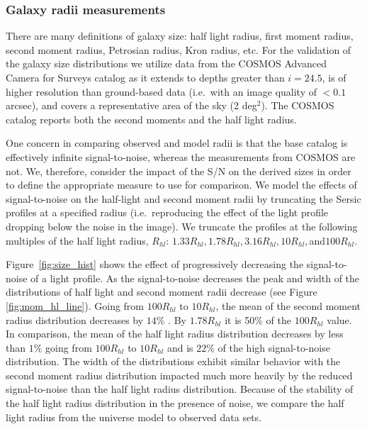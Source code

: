 \documentclass[11pt]{article}
\begin{document}
\subsubsection{Galaxy radii measurements}
There are many definitions of galaxy size: half light radius, first
moment radius, second moment radius, Petrosian radius, Kron radius,
etc.  For the validation of the galaxy size distributions we utilize
data from the COSMOS Advanced Camera for Surveys catalog
\citep{cosmos} as it extends to depths greater than $i=24.5$, is of
higher resolution than ground-based data (i.e.\ with an image quality
of $<0.1$ arcsec), and covers a representative area of the sky (2
deg$^2$). The COSMOS catalog reports both the second moments and the
half light radius.

One concern in comparing observed and model radii is that the base
catalog is effectively infinite signal-to-noise, whereas the
measurements from COSMOS are not.  We, therefore, consider the impact
of the S/N on the derived sizes in order to define the appropriate
measure to use for comparison. We model the effects of signal-to-noise
on the half-light and second moment radii by truncating the Sersic
profiles at a specified radius (i.e.\ reproducing the effect of the
light profile dropping below the noise in the image).  We truncate the
profiles at the following multiples of the half light radius,
$R_{hl}$: $1.33R_{hl}, 1.78R_{hl}, 3.16R_{hl}, 10R_{hl},
$and$100R_{hl}$.

Figure~\ref{fig:size_hist} shows the effect of progressively
decreasing the signal-to-noise of a light profile.  As the
signal-to-noise decreases the peak and width of the distributions of
half light and second moment radii decrease (see Figure
\ref{fig:mom_hl_line}).  Going from $100R_{hl}$ to $10R_{hl}$, the
mean of the second moment radius distribution decreases by $14\%$ . By
$1.78R_{hl}$ it is 50\% of the $100R_{hl}$ value.  In comparison, the
mean of the half light radius distribution decreases by less than
$1\%$ going from $100R_{hl}$ to $10R_{hl}$ and is $22\%$ of the high
signal-to-noise distribution.  The width of the distributions exhibit
similar behavior with the second moment radius distribution impacted
much more heavily by the reduced signal-to-noise than the half light
radius distribution.  Because of the stability of the half light
radius distribution in the presence of noise, we compare the half
light radius from the universe model to observed data sets.
\end{document}
